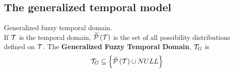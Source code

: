 %
%
%


\subsection{\label{subsec:temporal-model}The generalized temporal model}

\begin{definition}
Generalized fuzzy temporal domain.\\
If $\mathcal{T}$ is the temporal domain, $\widetilde {\mathcal{P}}\left( \mathcal{T}\right)$ is the set of all possibility distributions defined on $\mathcal{T}$.
The \textbf{Generalized Fuzzy Temporal Domain}, $\mathcal{T}_G$ is
\begin{equation}
\mathcal{T}_G \subseteq \left \lbrace \widetilde {\mathcal{P}}\left( \mathcal{T}\right) \cup NULL \right \rbrace
\end{equation}
\end{definition}